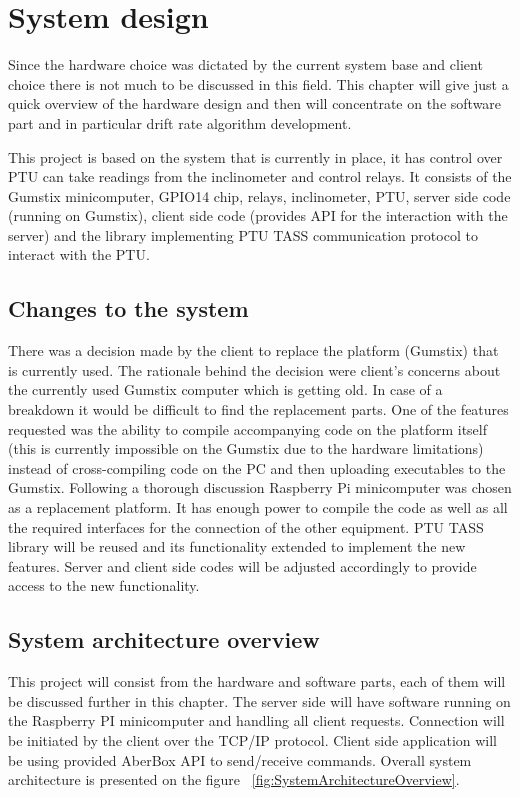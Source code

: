 \chapter{System design}
Since the hardware choice was dictated by the current system base and client choice there is not much to be discussed in this field. This chapter will give just a quick overview of the hardware design and then will concentrate on the software part and in particular drift rate algorithm development.

This project is based on the system that is currently in place, it has control over PTU can take readings from the inclinometer and control relays. It consists of the Gumstix minicomputer, GPIO14 chip, relays, inclinometer, PTU, server side code (running on Gumstix), client side code (provides API for the interaction with the server) and the library implementing PTU TASS communication protocol to interact with the PTU. 

\section{Changes to the system}
There was a decision made by the client to replace the platform (Gumstix) that is currently used. The rationale behind the decision were client's concerns about the currently used Gumstix computer which is getting old. In case of a breakdown it would be difficult to find the replacement parts. One of the features requested was the ability to compile accompanying code on the platform itself (this is currently impossible on the Gumstix due to the hardware limitations) instead of cross-compiling code on the PC and then uploading executables to the Gumstix. Following a thorough discussion Raspberry Pi minicomputer was chosen as a replacement platform. It has enough power to compile the code as well as all the required interfaces for the connection of the other equipment. PTU TASS library will be reused and its functionality extended to implement the new features. Server and client side codes will be adjusted accordingly to provide access to the new functionality.

\section{System architecture overview}
This project will consist from the hardware and software parts, each of them will be discussed further in this chapter. The server side will have software running on the Raspberry PI minicomputer and handling all client requests. Connection will be initiated by the client over the TCP/IP protocol. Client side application will be using provided AberBox API to send/receive commands. Overall system architecture is presented on the figure ~\ref{fig:SystemArchitectureOverview}.

